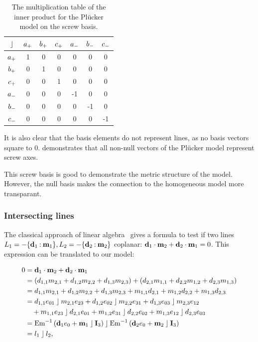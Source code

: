 \begin{table}
  \caption{The multiplication table of the inner product for the Pl\"ucker model on the screw basis.}
  \label{tab:screwmetric}
  \begin{center}
    \begin{tabular}{|c||c|c|c|c|c|c|}
      \hline
      $\mathbin{\rfloor}$ & $a_{+}$ & $b_{+}$ & $c_{+}$ & $a_{-}$ & $b_{-}$ & $c_{-}$ \\
      \hline \hline
      $a_{+}$ & 1 & 0 & 0 & 0 & 0 & 0 \\
      \hline
      $b_{+}$ & 0 & 1 & 0 & 0 & 0 & 0 \\
      \hline
      $c_{+}$ & 0 & 0 & 1 & 0 & 0 & 0 \\
      \hline
      $a_{-}$ & 0 & 0 & 0 & -1 & 0 & 0 \\
      \hline
      $b_{-}$ & 0 & 0 & 0 & 0 & -1 & 0 \\
      \hline
      $c_{-}$ & 0 & 0 & 0 & 0 & 0 & -1 \\
      \hline
    \end{tabular}
  \end{center}
\end{table}

It is also clear that the basis elements do not represent lines, as no basis vectors square to $0$.   demonstrates that all non-null vectors of the Pl\"ucker model represent screw axes.  

This screw basis is good to demonstrate the metric structure of the model.  However, the null basis makes the connection to the homogeneous model more transparant.  

\subsubsection{Intersecting lines}
The classical approach of linear algebra~\cite{Shoemake} gives a formula to test if two lines $L_1 = -\{\mathbf{d}_1 \mathbin{:} \mathbf{m}_1\}, L_2 = -\{\mathbf{d}_2 \mathbin{:} \mathbf{m}_2\}$ coplanar: $\mathbf{d}_1 \mathbin{\cdot} \mathbf{m}_2 + \mathbf{d}_2 \mathbin{\cdot} \mathbf{m}_1 = 0$.  This expression can be translated to our model:

\begin{align}
  \label{eq:coplanar}
  0 &= \mathbf{d}_1 \mathbin{\cdot} \mathbf{m}_2 + \mathbf{d}_2 \mathbin{\cdot} \mathbf{m}_1 \\
    &= \left( d_{1,1} m_{2,1} + d_{1,2} m_{2,2} + d_{1,3} m_{2,3} \right) + \left( d_{2,1} m_{1,1} + d_{2,2} m_{1,2} + d_{2,3} m_{1,3} \right) \\
    &= d_{1,1} m_{2,1} + d_{1,2} m_{2,2} + d_{1,3} m_{2,3} + m_{1,1} d_{2,1} + m_{1,2} d_{2,2} + m_{1,3} d_{2,3} \\
    &= d_{1,1} e_{01} \mathbin{\rfloor} m_{2,1} e_{23} + d_{1,2} e_{02} \mathbin{\rfloor} m_{2,2} e_{31} + d_{1,3} e_{03} \mathbin{\rfloor} m_{2,3} e_{12} \\
    &\quad + m_{1,1} e_{23} \mathbin{\rfloor} d_{2,1} e_{01} + m_{1,2} e_{31} \mathbin{\rfloor} d_{2,2} e_{02} + m_{1,3} e_{12} \mathbin{\rfloor} d_{2,3} e_{03} \\
    &= \operatorname{Em}^{-1}\left( \mathbf{d}_1e_0 + \mathbf{m}_1 \mathbin{\rfloor} \mathbf{I}_3 \right) \mathbin{\rfloor} \operatorname{Em}^{-1}\left( \mathbf{d}_2e_0 + \mathbf{m}_2 \mathbin{\rfloor} \mathbf{I}_3 \right) \\
    &= l_1 \mathbin{\rfloor} l_2,
\end{align}

